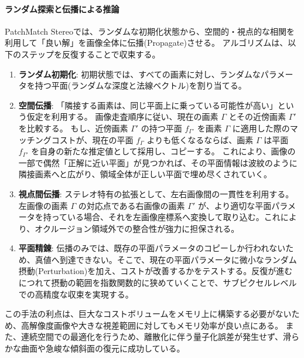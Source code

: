 \paragraph{ランダム探索と伝播による推論}
PatchMatch Stereoでは、ランダムな初期化状態から、空間的・視点的な相関を利用して「良い解」を画像全体に伝播(Propagate)させる。
アルゴリズムは、以下のステップを反復することで収束する。

\begin{enumerate}
    \item \textbf{ランダム初期化}:
    初期状態では、すべての画素に対し、ランダムなパラメータを持つ平面(ランダムな深度と法線ベクトル)を割り当てる。

    \item \textbf{空間伝播}:
    「隣接する画素は、同じ平面上に乗っている可能性が高い」という仮定を利用する。
    画像走査順序に従い、現在の画素 $\Gamma$ とその近傍画素 $\Gamma'$を比較する。
    もし、近傍画素 $\Gamma'$ の持つ平面 $f_{\Gamma'}$ を画素 $\Gamma$ に適用した際のマッチングコストが、現在の平面 $f_\Gamma$ よりも低くなるならば、画素 $\Gamma$ は平面 $f_{\Gamma'}$ を自身の新たな推定値として採用し、コピーする。
    これにより、画像の一部で偶然「正解に近い平面」が見つかれば、その平面情報は波紋のように隣接画素へと広がり、領域全体が正しい平面で埋め尽くされていく。

    \item \textbf{視点間伝播}:
    ステレオ特有の拡張として、左右画像間の一貫性を利用する。
    左画像の画素 $\Gamma$ の対応点である右画像の画素 $\Gamma'$ が、より適切な平面パラメータを持っている場合、それを左画像座標系へ変換して取り込む。これにより、オクルージョン領域外での整合性が強力に担保される。

    \item \textbf{平面精錬}:
    伝播のみでは、既存の平面パラメータのコピーしか行われないため、真値へ到達できない。そこで、現在の平面パラメータに微小なランダム摂動(Perturbation)を加え、コストが改善するかをテストする。反復が進むにつれて摂動の範囲を指数関数的に狭めていくことで、サブピクセルレベルでの高精度な収束を実現する。
\end{enumerate}


この手法の利点は、巨大なコストボリュームをメモリ上に構築する必要がないため、高解像度画像や大きな視差範囲に対してもメモリ効率が良い点にある。
また、連続空間での最適化を行うため、離散化に伴う量子化誤差が発生せず、滑らかな曲面や急峻な傾斜面の復元に成功している。


